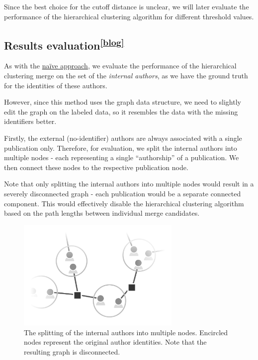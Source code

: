 Since the best choice for the cutoff distance is unclear, we will later evaluate the performance of the hierarchical clustering algorithm for different threshold values.

\subsection[Results evaluation]{Results evaluation\textsuperscript{\href{https://jindrich.bar/edu/thesis-blog/inference-hierarchical/}{[blog]}}}

As with the \hyperref[sec:results-assessment]{naïve approach}, we evaluate the performance of the hierarchical clustering merge on the set of the \textit{internal authors},
as we have the ground truth for the identities of these authors.

However, since this method uses the graph data structure, we need to slightly edit the graph on the labeled data,
so it resembles the data with the missing identifiers better.

Firstly, the external (no-identifier) authors are always associated with a single publication only. 
Therefore, for evaluation, we split the internal authors into multiple nodes - each representing a single ``authorship'' of a publication.
We then connect these nodes to the respective publication node.

Note that only splitting the internal authors into multiple nodes would result in a severely disconnected graph
- each publication would be a separate connected component.
This would effectively disable the hierarchical clustering algorithm based on the path lengths between 
individual merge candidates. 

\begin{figure}[ht!]
    \captionsetup{width=.9\linewidth}
    \includegraphics[width=0.7\textwidth]{../img/merging-splitting-internals.png}
    \centering
    \caption{The splitting of the internal authors into multiple nodes. Encircled nodes represent the original author identities. Note that the resulting graph is disconnected.}
\end{figure}

